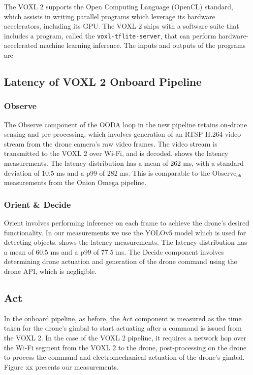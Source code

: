 The VOXL 2 supports the Open Computing Language (OpenCL) standard, which
assists in writing parallel programs which leverage its hardware accelerators,
including its GPU. The VOXL 2 ships with a software suite that includes a
program, called the \texttt{voxl-tflite-server}, that can perform
hardware-accelerated machine learning inference. The inputs and outputs of the
programs are


\subsection{Latency of VOXL 2 Onboard Pipeline}

\subsubsection*{Observe}

The Observe component of the OODA loop in the new pipeline retains on-drone
sensing and pre-processing, which involves generation of an RTSP H.264 video
stream from the drone camera's raw video frames. The video stream is
transmitted to the VOXL 2 over Wi-Fi, and is decoded.
 shows the latency measurements. The
latency distribution has a mean of 262 ms, with a standard deviation of 10.5 ms
and a p99 of 282 ms. This is comparable to the Observe$_{ab}$ measurements from
the Onion Omega pipeline.

\subsubsection*{Orient \& Decide}

Orient involves performing inference on each frame to achieve the drone's
desired functionality. In our measurements we use the YOLOv5 model which is
used for detecting objects.  shows the latency
measurements.  The latency distribution has a mean of 60.5 ms and a p99 of 77.5
ms. The Decide component involves determining drone actuation and generation of
the drone command using the drone API, which is negligible.

\subsection*{Act}

In the onboard pipeline, as before, the Act component is measured as the time
taken for the drone's gimbal to start actuating after a command is issued from
the VOXL 2. In the case of the VOXL 2 pipeline, it requires a network hop over
the Wi-Fi segment from the VOXL 2 to the drone, post-processing on the drone to
process the command and electromechanical actuation of the drone's gimbal.
Figure xx presents our measurements.

